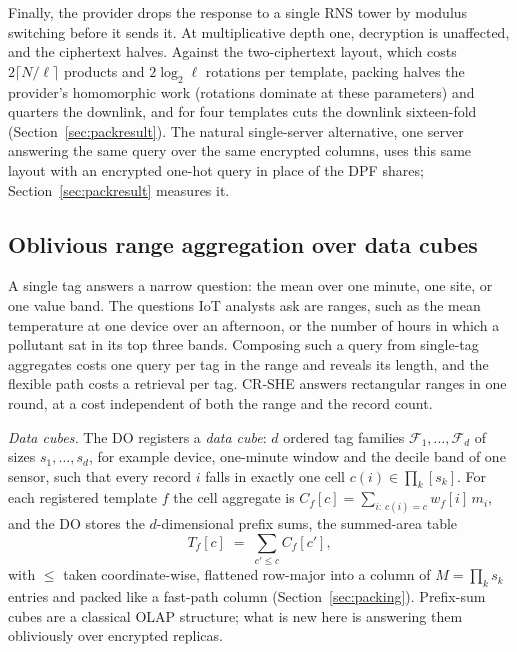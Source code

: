 \documentclass[a4paper,fleqn]{cas-sc}
\begin{document}
Finally, the provider drops the response to a single RNS tower by modulus
switching before it sends it. At multiplicative depth one, decryption is
unaffected, and the ciphertext halves. Against the two-ciphertext layout, which
costs $2\lceil N/\ell\rceil$ products and $2\log_2\ell$ rotations per template,
packing halves the provider's homomorphic work (rotations dominate at these
parameters) and quarters the downlink, and for four templates cuts the
downlink sixteen-fold (Section~\ref{sec:packresult}). The natural single-server
alternative, one server answering the same query over the same encrypted
columns, uses this same layout with an encrypted one-hot
query in place of the DPF shares; Section~\ref{sec:packresult} measures it.

\subsection{Oblivious range aggregation over data cubes}
\label{sec:range}
A single tag answers a narrow question: the mean over one minute, one site, or
one value band. The questions IoT analysts ask are ranges, such as the mean
temperature at one device over an afternoon, or the number of hours in which a
pollutant sat in its top three bands. Composing such a query from single-tag
aggregates costs one query per tag in the range and reveals its length, and the
flexible path costs a retrieval per tag. CR-SHE answers rectangular ranges in
one round, at a cost independent of both the range and the record count.

\emph{Data cubes.} The DO registers a \emph{data cube}: $d$ ordered tag
families $\mathcal{F}_1,\dots,\mathcal{F}_d$ of sizes $s_1,\dots,s_d$, for
example device, one-minute window and the decile band of one sensor, such that
every record $i$ falls in exactly one cell $c(i)\in\prod_k[s_k]$. For each
registered template $f$ the cell aggregate is
$C_f[c]=\sum_{i:\,c(i)=c}w_f[i]\,m_i$, and the DO stores the $d$-dimensional
prefix sums, the summed-area table
\[
T_f[c] \;=\; \sum_{c'\le c} C_f[c'] ,
\]
with $\le$ taken coordinate-wise, flattened row-major into a column of
$M=\prod_k s_k$ entries and packed like a fast-path column
(Section~\ref{sec:packing}). Prefix-sum cubes are a classical OLAP structure;
what is new here is answering them obliviously over encrypted replicas.
\end{document}
